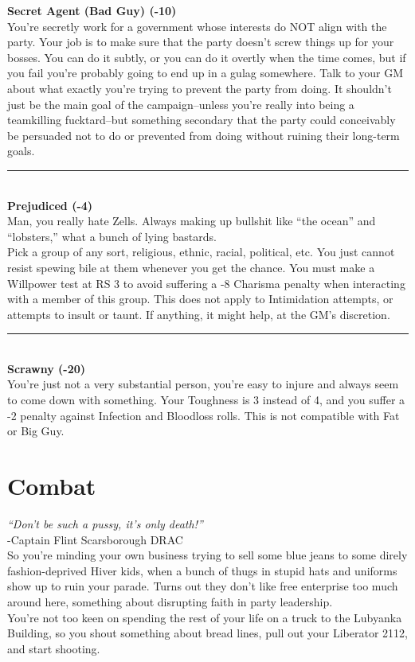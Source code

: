 \documentclass[a4paper, twocolumn, openany]{book}
\begin{document}
{{\bfseries Secret Agent (Bad Guy) (-10)\\}
You’re secretly work for a government whose interests do NOT align with the party. Your job is
to make sure that the party doesn’t screw things up for your bosses. You can do it subtly, or you
can do it overtly when the time comes, but if you fail you’re probably going to end up in a gulag
somewhere. Talk to your GM about what exactly you’re trying to prevent the party from doing. It
shouldn’t just be the main goal of the campaign--unless you’re really into being a teamkilling
fucktard--but something secondary that the party could conceivably be persuaded not to do or
prevented from doing without ruining their long-term goals.\\
\hrule\ \\

{\bfseries Prejudiced (-4)\\}
Man, you really hate Zells. Always making up bullshit like “the ocean” and “lobsters,” what a
bunch of lying bastards.\\
Pick a group of any sort, religious, ethnic, racial, political, etc. You just cannot resist spewing
bile at them whenever you get the chance. You must make a Willpower test at RS 3 to avoid
suffering a -8 Charisma penalty when interacting with a member of this group. This does not
apply to Intimidation attempts, or attempts to insult or taunt. If anything, it might help, at the
GM’s discretion.\\
\hrule\ \\

{\bfseries Scrawny (-20)\\}
You’re just not a very substantial person, you’re easy to injure and always seem to come down
with something. Your Toughness is 3 instead of 4, and you suffer a -2 penalty against Infection
and Bloodloss rolls. This is not compatible with Fat or Big Guy.

\chapter{Combat}

{\itshape“Don’t be such a pussy, it’s only death!”}\\
\hspace*{\fill} -Captain Flint Scarsborough DRAC\\

So you’re minding your own business trying to sell some blue jeans to some direly
fashion-deprived Hiver kids, when a bunch of thugs in stupid hats and uniforms show up to ruin
your parade. Turns out they don’t like free enterprise too much around here, something about
disrupting faith in party leadership.\\
You’re not too keen on spending the rest of your life on a truck to the Lubyanka Building, so you
shout something about bread lines, pull out your Liberator 2112, and start shooting.\\

}
\end{document}

